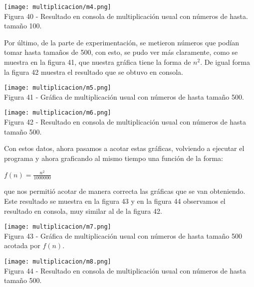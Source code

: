 \documentclass[12pt,twoside]{article}
\begin{document}
\begin{center}
    \texttt{[image: multiplicacion/m4.png]}\\
    Figura 40 - Resultado en consola de multiplicación usual con números de hasta. tamaño 100.
\end{center}
Por último, de la parte de experimentación, se metieron números que podían tomar hasta tamaños de 500, con esto, se pudo ver más claramente, como se muestra en la figura 41, que nuestra gráfica tiene la forma de $n^2$. De igual forma la figura 42 muestra el resultado que se obtuvo en consola.
\begin{center}
    \texttt{[image: multiplicacion/m5.png]}\\
    Figura 41 - Gráfica de multiplicación usual con números de hasta tamaño 500.
\end{center}
\begin{center}
    \texttt{[image: multiplicacion/m6.png]}\\
    Figura 42 - Resultado en consola de multiplicación usual con números de hasta tamaño 500.
\end{center}
Con estos datos, ahora pasamos a acotar estas gráficas, volviendo a ejecutar el programa y ahora graficando al mismo tiempo una función de la forma:
\begin{center}
    $f(n) = \frac{n^2}{1000000}$
\end{center}
que nos permitió acotar de manera correcta las gráficas que se van obteniendo. Este resultado se muestra en la figura 43 y en la figura 44 observamos el resultado en consola, muy similar al de la figura 42.
\begin{center}
    \texttt{[image: multiplicacion/m7.png]}\\
    Figura 43 - Gráfica de multiplicación usual con números de hasta tamaño 500 acotada por $f(n)$.
\end{center}
\begin{center}
    \texttt{[image: multiplicacion/m8.png]}\\
    Figura 44 - Resultado en consola de multiplicación usual con números de hasta tamaño 500.
\end{center}
\end{document}
